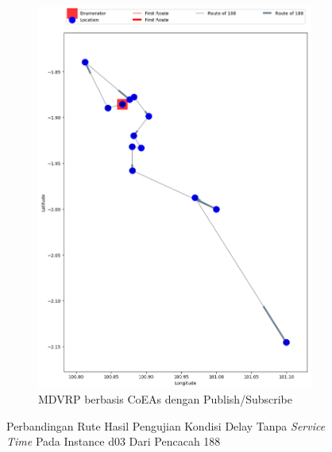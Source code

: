 \begin{figure}[H]\ContinuedFloat
	\centering
	\begin{subfigure}[t]{\textwidth}
		\centering
		\includegraphics[width=\textwidth]{Resources/Images/delayed_3/real_m15_n100_delayed_3_188_pubsub_coes}
		\caption{MDVRP berbasis CoEAs dengan Publish/Subscribe}
		\label{fig:real_m15_n100_delayed_3_188_pubsub_coes}
	\end{subfigure}
	\caption{Perbandingan Rute Hasil Pengujian Kondisi Delay Tanpa \textit{Service Time} Pada Instance d03 Dari Pencacah 188}
	\label{fig:real_m15_n100_delayed_3_188_contd}
\end{figure}


